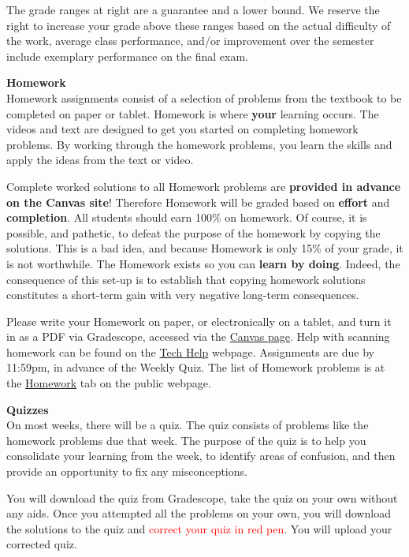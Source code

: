 \documentclass[12pt]{article}
\renewcommand{\emph}[1]{\textsf{\textbf{#1}}}
\newcommand{\localhead}[1]{\par\smallskip\textbf{#1} \smallskip\nobreak\\}%
\def\heading#1{\localhead{\large\emph{#1}}}
\begin{document}
The grade ranges at right are a guarantee and a lower bound. We reserve the right to increase your grade above these ranges based on the actual difficulty of the work, average class performance, and/or improvement over the semester include exemplary performance on the final exam. \\

\heading{Homework}
Homework assignments consist of a selection of problems from the textbook to be completed on paper or tablet.  Homework is where \textbf{your} learning occurs. The videos and text are designed to get you started on completing homework problems. By working through the homework problems, you learn the skills and apply the ideas from the text or video.

Complete worked solutions to all Homework problems are \emph{provided in advance on the Canvas site}!  Therefore Homework will be graded based on \emph{effort} and \emph{completion}.  All students should earn 100\% on homework.  Of course, it is possible, and pathetic, to defeat the purpose of the homework by copying the solutions.  This is a bad idea, and because Homework is only 15\% of your grade, it is not worthwhile.  The Homework exists so you can \emph{learn by doing}. Indeed, the consequence of this set-up is to establish that copying homework solutions constitutes a short-term gain with very negative long-term consequences. 

Please write your Homework on paper, or electronically on a tablet, and turn it in as a PDF via Gradescope, accessed via the \href{https://canvas.alaska.edu/courses/21589}{Canvas page}.  Help with scanning homework can be found on the \href{https://uaf-math251.github.io/techHelp.html}{Tech Help} webpage.  Assignments are due by 11:59pm, in advance of the Weekly Quiz. The list of Homework problems is at the \href{https://uaf-math251.github.io/calc2/homework.html}{Homework} tab on the public webpage.

\heading{Quizzes}
On most weeks, there will be a quiz.  The quiz consists of problems like the homework problems due that week. The purpose of the quiz is to help you consolidate your learning from the week, to identify areas of confusion, and then provide an opportunity to fix any misconceptions.  

You will download the quiz from Gradescope, take the quiz on your own without any aids. Once you attempted all the problems on your own, you will download the solutions to the quiz and \textcolor{red}{correct your quiz in red pen}. You will upload your corrected quiz. 
\end{document}
